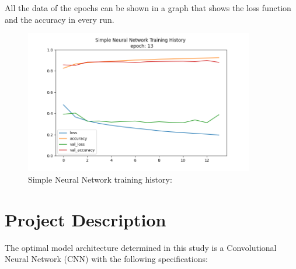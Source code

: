 \documentclass{article}
\begin{document}
All the data of the epochs can be shown in a graph that shows the loss function and the accuracy in every run.
\begin{figure}[H]
    \caption{Simple Neural Network training history:}
    \centering
    \includegraphics[width=10cm]{imgFolder/SimpleNeuralNetwork_fig.png}
\end{figure}
\newpage
\section{Project Description}

The optimal model architecture determined in this study is a Convolutional Neural Network (CNN) with the following specifications:
\end{document}

